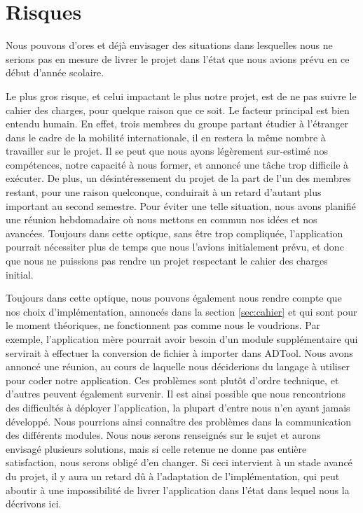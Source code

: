 \section{Risques}
    Nous pouvons d'ores et déjà envisager des situations dans lesquelles nous ne serions pas en mesure de livrer le projet dans l'état que nous avions prévu en ce début d'année scolaire.

    Le plus gros risque, et celui impactant le plus notre projet, est de ne pas suivre le cahier des charges, pour quelque raison que ce soit.
    Le facteur principal est bien entendu humain. En effet, trois membres du groupe partant étudier à l'étranger dans le cadre de la mobilité internationale, il en restera la même nombre à travailler sur le projet. Il se peut que nous ayons légèrement sur-estimé nos compétences, notre capacité à nous former, et annoncé une tâche trop difficile à exécuter. De plus, un désintéressement du projet de la part de l'un des membres restant, pour une raison quelconque, conduirait à un retard d'autant plus important au second semestre. Pour éviter une telle situation, nous avons planifié une réunion hebdomadaire où nous mettons en commun nos idées et nos avancées. Toujours dans cette optique, sans être trop compliquée, l'application pourrait nécessiter plus de temps que nous l'avions initialement prévu, et donc que nous ne puissions pas rendre un projet respectant le cahier des charges initial.

    Toujours dans cette optique, nous pouvons également nous rendre compte que nos choix d'implémentation, annoncés dans la section \ref{sec:cahier} et qui sont pour le moment théoriques, ne fonctionnent pas comme nous le voudrions. Par exemple, l'application mère pourrait avoir besoin d'un module supplémentaire qui servirait à effectuer la conversion de fichier à importer dans ADTool. Nous avons annoncé une réunion, au cours de laquelle nous déciderions du langage à utiliser pour coder notre application.
    Ces problèmes sont plutôt d'ordre technique, et d'autres peuvent également survenir. Il est ainsi possible que nous rencontrions des difficultés à déployer l'application, la plupart d'entre nous n'en ayant jamais développé. Nous pourrions ainsi connaître des problèmes dans la communication des différents modules. Nous nous serons renseignés sur le sujet et aurons envisagé plusieurs solutions, mais si celle retenue ne donne pas entière satisfaction, nous serons obligé d'en changer. Si ceci intervient à un stade avancé du projet, il y aura un retard dû à l'adaptation de l'implémentation, qui peut aboutir à une impossibilité de livrer l'application dans l'état dans lequel nous la décrivons ici.

